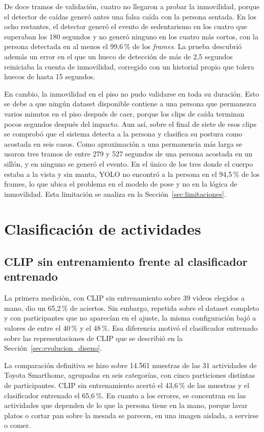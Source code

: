 De doce tramos de validación, cuatro no llegaron a probar la inmovilidad, porque el detector de caídas generó antes una falsa caída con la persona sentada.
En los ocho restantes, el detector generó el evento de sedentarismo en los cuatro que superaban los 180 segundos y no generó ninguno en los cuatro más cortos, con la persona detectada en al menos el 99,6\,\% de los \textit{frames}.
La prueba descubrió además un error en el que un hueco de detección de más de 2,5 segundos reiniciaba la cuenta de inmovilidad, corregido con un historial propio que tolera huecos de hasta 15 segundos.

En cambio, la inmovilidad en el piso no pudo validarse en toda su duración.
Esto se debe a que ningún dataset disponible contiene a una persona que permanezca varios minutos en el piso después de caer, porque los clips de caída terminan pocos segundos después del impacto.
Aun así, sobre el final de siete de esos clips se comprobó que el sistema detecta a la persona y clasifica su postura como acostada en seis casos.
Como aproximación a una permanencia más larga se usaron tres tramos de entre 279 y 527 segundos de una persona acostada en un sillón, y en ninguno se generó el evento.
En el único de los tres donde el cuerpo estaba a la vista y sin manta, YOLO no encontró a la persona en el 94,5\,\% de los frames, lo que ubica el problema en el modelo de pose y no en la lógica de inmovilidad.
Esta limitación se analiza en la Sección~\ref{sec:limitaciones}.

\section{Clasificación de actividades}
\label{sec:pruebas_actividades}

\subsection{CLIP sin entrenamiento frente al clasificador entrenado}

La primera medición, con CLIP sin entrenamiento sobre 39 videos elegidos a mano, dio un 65,2\,\% de aciertos.
Sin embargo, repetida sobre el dataset completo y con participantes que no aparecían en el ajuste, la misma configuración bajó a valores de entre el 40\,\% y el 48\,\%.
Esa diferencia motivó el clasificador entrenado sobre las representaciones de CLIP que se describió en la Sección~\ref{sec:evolucion_diseno}.

La comparación definitiva se hizo sobre 14.561 muestras de las 31 actividades de Toyota Smarthome, agrupadas en seis categorías, con cinco particiones distintas de participantes.
CLIP sin entrenamiento acertó el 43,6\,\% de las muestras y el clasificador entrenado el 65,6\,\%.
En cuanto a los errores, se concentran en las actividades que dependen de lo que la persona tiene en la mano, porque lavar platos o cortar pan sobre la mesada se parecen, en una imagen aislada, a servirse o comer.

